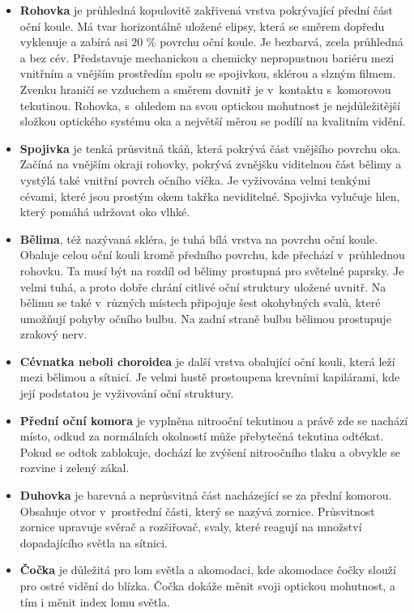 \begin{itemize}
  \item\textbf{Rohovka} je průhledná kopulovitě zakřivená vrstva pokrývající přední část oční koule. Má tvar horizontálně uložené elipsy, která se směrem dopředu vyklenuje a zabírá asi 20 \% povrchu oční koule. Je bezbarvá, zcela průhledná a bez cév. Představuje mechanickou a chemicky nepropustnou bariéru mezi vnitřním a vnějším prostředím spolu se spojivkou, sklérou a slzným filmem. Zvenku hraničí se vzduchem a směrem dovnitř je v~kontaktu s~komorovou tekutinou. Rohovka, s~ohledem na svou optickou mohutnost je nejdůležitější složkou optického systému oka a největší měrou se podílí na kvalitním vidění.
  \item\textbf{Spojivka} je tenká průsvitná tkáň, která pokrývá část vnějšího povrchu oka. Začíná na vnějším okraji rohovky, pokrývá zvnějšku viditelnou část bělimy a vystýlá také vnitřní povrch očního víčka. Je vyživována velmi tenkými cévami, které jsou prostým okem takřka neviditelné. Spojivka vylučuje hlen, který pomáhá udržovat oko vlhké.
  \item\textbf{Bělima}, též nazývaná skléra, je tuhá bílá vrstva na povrchu oční koule. Obaluje celou oční kouli kromě předního povrchu, kde přechází v~průhlednou rohovku. Ta musí být na rozdíl od bělimy prostupná pro světelné paprsky. Je velmi tuhá, a proto dobře chrání citlivé oční struktury uložené uvnitř. Na bělimu se také v~různých místech připojuje šest okohybných svalů, které umožňují pohyby očního bulbu. Na zadní straně bulbu bělimou prostupuje zrakový nerv.
  \item\textbf{Cévnatka neboli choroidea} je další vrstva obalující oční kouli, která leží mezi bělimou a sítnicí. Je velmi hustě prostoupena krevními kapilárami, kde její podstatou je vyživování oční struktury. 
  \item\textbf{Přední oční komora} je vyplněna nitrooční tekutinou a právě zde se nachází místo, odkud za normálních okolností může přebytečná tekutina odtékat. Pokud se odtok zablokuje, dochází ke zvýšení nitroočního tlaku a obvykle se rozvine i zelený zákal.
  \item\textbf{Duhovka} je barevná a neprůsvitná část nacházející se za přední komorou. Obsahuje otvor v~prostřední části, který se nazývá zornice. Průsvitnost zornice upravuje svěrač a rozšiřovač, svaly,
    které reagují na množství dopadajícího světla na sítnici.
  \item\textbf{Čočka} je důležitá pro lom světla a akomodaci, kde akomodace čočky slouží pro ostré vidění do blízka. Čočka dokáže měnit svoji optickou mohutnost, a tím i měnit index lomu světla.

\end{itemize}
